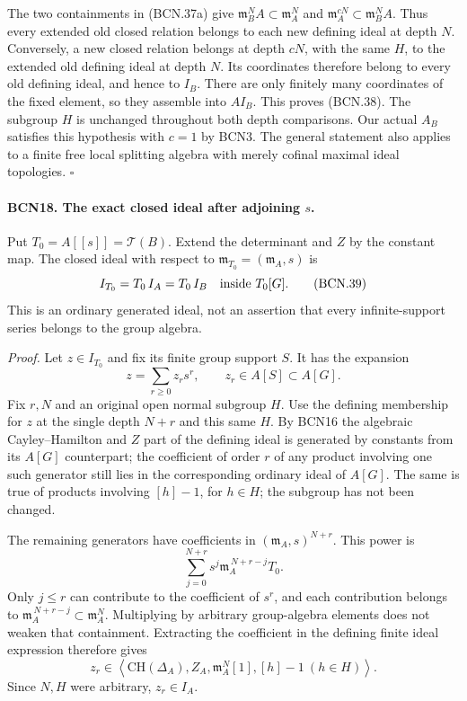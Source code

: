 The two containments in (BCN.37a) give
\(\mathfrak m_B^N A\subset\mathfrak m_A^N\) and
\(\mathfrak m_A^{cN}\subset\mathfrak m_B^N A\).
Thus every extended old closed relation belongs to each
new defining ideal at depth \(N\).  Conversely, a new
closed relation belongs at depth \(cN\), with the same
\(H\), to the extended old defining ideal at depth \(N\).
Its coordinates therefore belong to every old defining
ideal, and hence to \(I_B\).  There are only finitely many
coordinates of the fixed element, so they assemble into
\(AI_B\).  This proves (BCN.38).  The subgroup \(H\) is
unchanged throughout both depth comparisons.
Our actual \(A_B\) satisfies this hypothesis with \(c=1\)
by BCN3.  The general statement also applies to a finite
free local splitting algebra with merely cofinal maximal
ideal topologies.
\hfill\(\square\)

\paragraph{BCN18. The exact closed ideal after adjoining \(s\).}\label{claim:BCN18}
Put \(T_0=A[[s]]=\mathscr T(B)\).
Extend the determinant and \(Z\) by the constant map.
The closed ideal with respect to
\(\mathfrak m_{T_0}=(\mathfrak m_A,s)\) is
\[
 I_{T_0}=T_0\,I_A=T_0\,I_B
 \quad\hbox{inside }T_0[G].                                    \tag{BCN.39}
\]
This is an ordinary generated ideal, not an assertion that
every infinite-support series belongs to the group algebra.

\emph{Proof.}
Let \(z\in I_{T_0}\) and fix its finite group support \(S\).
It has the expansion
\[
 z=\sum_{r\ge0} z_rs^r,\qquad z_r\in A[S]\subset A[G].
                                                               \tag{BCN.40}
\]
Fix \(r,N\) and an original open normal subgroup \(H\).
Use the defining membership for \(z\) at the single depth
\(N+r\) and this same \(H\).  By BCN16 the algebraic
Cayley--Hamilton and \(Z\) part of the defining ideal is
generated by constants from its \(A[G]\) counterpart;
the coefficient of order \(r\) of any product involving
one such generator still lies in the corresponding
ordinary ideal of \(A[G]\).
The same is true of products involving \([h]-1\), for
\(h\in H\); the subgroup has not been changed.

The remaining generators have coefficients in
\((\mathfrak m_A,s)^{N+r}\).  This power is
\[
 \sum_{j=0}^{N+r}s^j\mathfrak m_A^{\,N+r-j}T_0.
\]
Only \(j\le r\) can contribute to the coefficient of
\(s^r\), and each contribution belongs to
\(\mathfrak m_A^{\,N+r-j}\subset\mathfrak m_A^N\).
Multiplying by arbitrary group-algebra elements does
not weaken that containment.  Extracting the coefficient
in the defining finite ideal expression therefore gives
\[
 z_r\in
 \left\langle\mathrm{CH}(\Delta_A),Z_A,\mathfrak m_A^N[1],
                  [h]-1\ (h\in H)\right\rangle .
\]
Since \(N,H\) were arbitrary, \(z_r\in I_A\).

